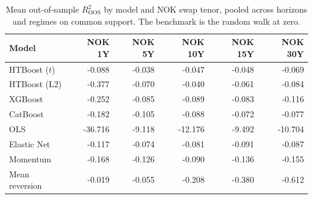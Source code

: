 \begin{table}[htbp]
\centering
\caption{Mean out-of-sample $R^2_{\text{OOS}}$ by model and NOK swap tenor, pooled across horizons and regimes on common support. The benchmark is the random walk at zero.}
\label{tab:oos_tenor}
\footnotesize
\begin{tabular}{lrrrrr}
\toprule
Model & NOK 1Y & NOK 5Y & NOK 10Y & NOK 15Y & NOK 30Y \\
\midrule
HTBoost ($t$) & -0.088 & -0.038 & -0.047 & -0.048 & -0.069 \\
HTBoost (L2) & -0.377 & -0.070 & -0.040 & -0.061 & -0.084 \\
XGBoost & -0.252 & -0.085 & -0.089 & -0.083 & -0.116 \\
CatBoost & -0.182 & -0.105 & -0.088 & -0.072 & -0.077 \\
OLS & -36.716 & -9.118 & -12.176 & -9.492 & -10.704 \\
Elastic Net & -0.117 & -0.074 & -0.081 & -0.091 & -0.087 \\
Momentum & -0.168 & -0.126 & -0.090 & -0.136 & -0.155 \\
Mean reversion & -0.019 & -0.055 & -0.208 & -0.380 & -0.612 \\
\bottomrule
\end{tabular}
\end{table}
